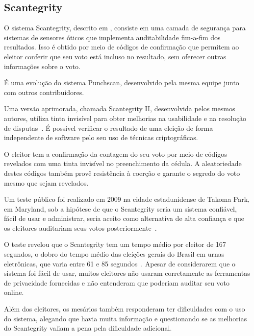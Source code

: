 \subsection{Scantegrity}

O sistema Scantegrity, descrito em \textcite{chaum2008scantegrity}, consiste em
uma camada de segurança para sistemas de sensores óticos que implementa
auditabilidade fim-a-fim dos resultados. Isso é obtido por meio de códigos de
confirmação que permitem ao eleitor conferir que seu voto está incluso no
resultado, sem oferecer outras informações sobre o voto.

É uma evolução do sistema Punchscan, desenvolvido pela mesma equipe junto com
outros contribuidores.

Uma versão aprimorada, chamada Scantegrity II, desenvolvida pelos mesmos
autores, utiliza tinta invisível para obter melhorias na usabilidade e na
resolução de disputas~\cite{chaum2008scantegrityII}. É possível verificar o
resultado de uma eleição de forma independente de software pelo seu uso de
técnicas criptográficas.

O eleitor tem a confirmação da contagem do seu voto por meio de códigos
revelados com uma tinta invisível no preenchimento da cédula. A aleatoriedade
destes códigos também provê resistência à coerção e garante o segredo do voto
mesmo que sejam revelados.

Um teste público foi realizado em 2009 na cidade estadunidense de Takoma Park,
em Maryland, sob a hipótese de que o Scantegrity seria um sistema confiável,
fácil de usar e administrar, seria aceito como alternativa de alta confiança e
que os eleitores auditariam seus votos
posteriormente~\cite{sherman2010scantegrity}.

O teste revelou que o Scantegrity tem um tempo médio por eleitor de 167
segundos, o dobro do tempo médio das eleições gerais do Brasil em urnas
eletrônicas, que varia entre 61 e 85 segundos~\cite{tse2014tempomedio}. Apesar
de considerarem que o sistema foi fácil de usar, muitos eleitores não usaram
corretamente as ferramentas de privacidade fornecidas e não entenderam que
poderiam auditar seu voto online.

Além dos eleitores, os mesários também responderam ter dificuldades com o uso
do sistema, alegando que havia muita informação e questionando se as melhorias
do Scantegrity valiam a pena pela dificuldade adicional.
